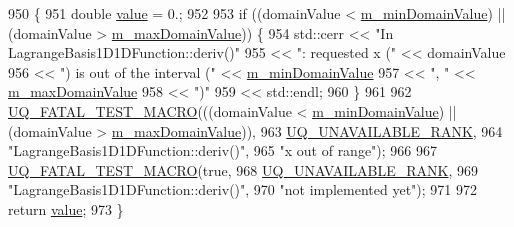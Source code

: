 \begin{DoxyCode}
950 \{
951   \textcolor{keywordtype}{double} \hyperlink{class_q_u_e_s_o_1_1_lagrange_basis1_d1_d_function_ae41dda050ae3e18f057a44fb2d64b6d2}{value} = 0.;
952 
953   \textcolor{keywordflow}{if} ((domainValue < \hyperlink{class_q_u_e_s_o_1_1_base1_d1_d_function_a7b18b3854ee74ef5befbc67b75ebbdc5}{m\_minDomainValue}) || (domainValue > 
      \hyperlink{class_q_u_e_s_o_1_1_base1_d1_d_function_aa0025999ccab2145cd46c0a81e260e8f}{m\_maxDomainValue})) \{
954     std::cerr << \textcolor{stringliteral}{"In LagrangeBasis1D1DFunction::deriv()"}
955               << \textcolor{stringliteral}{": requested x ("}            << domainValue
956               << \textcolor{stringliteral}{") is out of the interval ("} << \hyperlink{class_q_u_e_s_o_1_1_base1_d1_d_function_a7b18b3854ee74ef5befbc67b75ebbdc5}{m\_minDomainValue}
957               << \textcolor{stringliteral}{", "}                         << \hyperlink{class_q_u_e_s_o_1_1_base1_d1_d_function_aa0025999ccab2145cd46c0a81e260e8f}{m\_maxDomainValue}
958               << \textcolor{stringliteral}{")"}
959               << std::endl;
960   \}
961 
962   \hyperlink{_defines_8h_a56d63d18d0a6d45757de47fcc06f574d}{UQ\_FATAL\_TEST\_MACRO}(((domainValue < \hyperlink{class_q_u_e_s_o_1_1_base1_d1_d_function_a7b18b3854ee74ef5befbc67b75ebbdc5}{m\_minDomainValue}) || (domainValue 
      > \hyperlink{class_q_u_e_s_o_1_1_base1_d1_d_function_aa0025999ccab2145cd46c0a81e260e8f}{m\_maxDomainValue})),
963                       \hyperlink{namespace_q_u_e_s_o_a7d4679800a430ae8e473c1c7bc0bfb21}{UQ\_UNAVAILABLE\_RANK},
964                       \textcolor{stringliteral}{"LagrangeBasis1D1DFunction::deriv()"},
965                       \textcolor{stringliteral}{"x out of range"});
966 
967   \hyperlink{_defines_8h_a56d63d18d0a6d45757de47fcc06f574d}{UQ\_FATAL\_TEST\_MACRO}(\textcolor{keyword}{true},
968                       \hyperlink{namespace_q_u_e_s_o_a7d4679800a430ae8e473c1c7bc0bfb21}{UQ\_UNAVAILABLE\_RANK},
969                       \textcolor{stringliteral}{"LagrangeBasis1D1DFunction::deriv()"},
970                       \textcolor{stringliteral}{"not implemented yet"});
971 
972   \textcolor{keywordflow}{return} \hyperlink{class_q_u_e_s_o_1_1_lagrange_basis1_d1_d_function_ae41dda050ae3e18f057a44fb2d64b6d2}{value};
973 \}
\end{DoxyCode}
